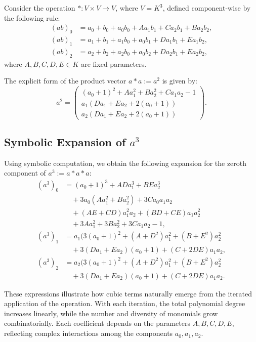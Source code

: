 \documentclass[12pt]{article}
\theoremstyle{definition}
\theoremstyle{plain}
\theoremstyle{remark}
\begin{document}
Consider the operation \( * : V \times V \to V \), where \( V = K^3 \), defined component-wise by the following rule:
\begin{align*}
(ab)_0 &= a_0 + b_0 + a_0 b_0 + A a_1 b_1 + C a_2 b_1 + B a_2 b_2, \\
(ab)_1 &= a_1 + b_1 + a_1 b_0 + a_0 b_1 + D a_1 b_1 + E a_1 b_2, \\
(ab)_2 &= a_2 + b_2 + a_2 b_0 + a_0 b_2 + D a_2 b_1 + E a_2 b_2,
\end{align*}
where \( A, B, C, D, E \in K \) are fixed parameters.

The explicit form of the product vector \( a * a := a^2 \) is given by:
\[
a^2 =
\begin{pmatrix}
(a_0 + 1)^2 + A a^2_1 + B a^2_2 + C a_1 a_2 -1 \\
a_1 (D a_1 + E a_2 + 2 (a_0 + 1)) \\
a_2 (D a_1 + E a_2 + 2 (a_0 + 1))
\end{pmatrix}.
\]

\subsection*{Symbolic Expansion of \texorpdfstring{$a^3$}{a³}}

Using symbolic computation, we obtain the following expansion for the zeroth component of \( a^3 := a * a * a \):
\begin{align*}
(a^3)_0 &= (a_0 + 1)^3 + A D a_1^3 + B E a_2^3 \\
&\quad + 3 a_0 (A a_1^2 + B a_2^2) + 3 C a_0 a_1 a_2 \\
&\quad + (A E + C D) a_1^2 a_2 + (B D + C E) a_1 a_2^2 \\
&\quad + 3 A a_1^2 + 3 B a_2^2 + 3 C a_1 a_2 - 1, \\
(a^3)_1 &= a_1 (3 (a_0 + 1)^2 + (A + D^2) a_1^2 + (B + E^2) a_2^2 \\
&\quad + 3 (D a_1 + E a_2) (a_0 + 1) + (C + 2 D E) a_1 a_2, \\
(a^3)_2 &= a_2 (3 (a_0 + 1)^2 + (A + D^2) a_1^2 + (B + E^2) a_2^2 \\
&\quad + 3 (D a_1 + E a_2) (a_0 + 1) + (C + 2 D E) a_1 a_2.
\end{align*}

These expressions illustrate how cubic terms naturally emerge from the iterated application of the operation. With each iteration, the total polynomial degree increases linearly, while the number and diversity of monomials grow combinatorially. Each coefficient depends on the parameters \( A, B, C, D, E \), reflecting complex interactions among the components \( a_0, a_1, a_2 \).
\end{document}
